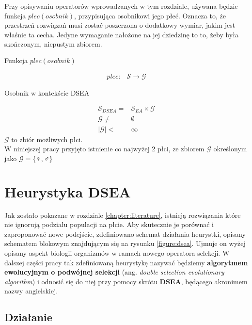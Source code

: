 \documentclass[twoside]{iisthesis}
\newcommand{\important}[1]{\mathcal{#1}}
\begin{document}
Przy opisywaniu operatorów wprowadzanych w tym rozdziale, używana będzie funkcja $plec(osobnik)$, przypisująca osobnikowi jego płeć.
Oznacza to, że przestrzeń rozwiązań musi zostać poszerzona o dodatkowy wymiar, jakim jest właśnie ta cecha.
Jedyne wymaganie nałożone na jej dziedzinę to to, żeby była skończonym, niepustym zbiorem.

\begin{signature}
	\caption{Funkcja $plec(osobnik)$ \label{signature:genderFoo}}
	\begin{align}
	plec: & \important{S} \rightarrow \important{G}
	\end{align}
\end{signature}

\begin{signature}
	\caption{Osobnik w kontekście DSEA \label{signature:specimen_dsea}}
	\begin{align}
	\important{S}_{DSEA} = &\important{S}_{EA} \times \important{G} \\
	\important{G} \neq & \emptyset \\
	|\important{G}| < &\infty
	\end{align}	
	$\important{G}$ to zbiór możliwych płci.\\
	W niniejszej pracy przyjęto istnienie co najwyżej 2 płci, ze zbiorem $\important{G}$ określonym jako $\important{G} = \{ \female, \male \}$
\end{signature}

\section{Heurystyka DSEA} \label{section:dsea}

Jak zostało pokazane w rozdziale \ref{chapter:literature}, istnieją rozwiązania które nie ignorują podziału populacji na płcie. 
Aby skutecznie je porównać i zaproponować nowe podejście, zdefiniowano schemat działania heurystki, opisany schematem blokowym znajdującym się na rysunku \ref{figure:dsea}. Ujmuje on wyżej opisany aspekt biologii organizmów w ramach nowego operatora selekcji. 
W dalszej części pracy tak zdefiniowaną heurystykę nazywać będziemy \textbf{algorytmem ewolucyjnym o podwójnej selekcji} (ang. \emph{double selection evolutionary algorithm}) i odnosić się do niej przy pomocy skrótu \textbf{DSEA}, będącego akronimem nazwy angielskiej.

\subsection{Działanie} \label{subsection:dsea_scheme}
\end{document}
